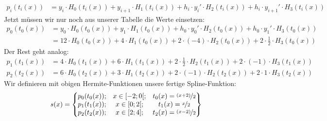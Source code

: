{		\begin{align*} 
 			p_i(t_i(x)) &= y_i \cdot H_0(t_i(x)) + y_{i+1} \cdot H_1(t_i(x)) + h_i \cdot y_i' \cdot H_2(t_i(x)) + h_i \cdot y_{i+1}' \cdot H_3(t_i(x))
 		\end{align*}
		Jetzt müssen wir nur noch aus unserer Tabelle die Werte einsetzen:
		\begin{align*} 
 			p_0(t_0(x)) &= y_0\cdot H_0(t_0(x))+y_{1}\cdot H_1(t_0(x))+h_0\cdot y_0'\cdot H_2(t_0(x))+h_0\cdot y_{1}'\cdot H_3(t_0(x)) \\
			&= 12\cdot H_0(t_0(x))+ 4\cdot H_1(t_0(x))+2\cdot (-4)\cdot H_2(t_0(x))+2\cdot \frac{1}{2}\cdot H_3(t_0(x)) 
 		\end{align*}
		Der Rest geht analog:
		\begin{align*} 
 			p_1(t_1(x)) &= 4\cdot H_0(t_1(x))+ 6\cdot H_1(t_1(x))+2\cdot \frac{1}{2}\cdot H_2(t_1(x))+2\cdot (-1)\cdot H_3(t_1(x)) \\
			p_2(t_2(x)) &= 6\cdot H_0(t_2(x))+ 3\cdot H_1(t_2(x))+2\cdot (-1)\cdot H_2(t_2(x))+2\cdot 1\cdot H_3(t_2(x)) 
 		\end{align*}
		Wir definieren mit obigen Hermite-Funktionen unsere fertige Spline-Funktion:
		\begin{align*}
			s(x) = 
			\begin{Bmatrix}
				p_0(t_0(x)); & x\in[-2;0[; & t_0(x) = \nicefrac{(x+2)}{2}\\
				p_1(t_1(x)); & x\in[0;2[;  & t_1(x) = \nicefrac{x}{2}\\
				p_2(t_2(x)); & x\in[2;4];  & t_2(x) = \nicefrac{(x-2)}{2}
			\end{Bmatrix}
		\end{align*}
	}
	
	\sbreak


